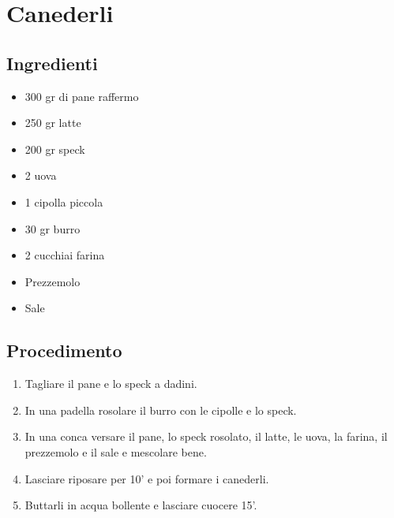 \section{Canederli}
\subsection{Ingredienti}
\begin{itemize}
\item 300 gr di pane raffermo  
\item 250 gr latte  
\item 200 gr speck  
\item 2 uova  
\item 1 cipolla piccola  
\item 30 gr burro  
\item 2 cucchiai farina   
\item Prezzemolo  
\item Sale
\end{itemize}
\subsection{Procedimento}
\begin{enumerate}
\item  Tagliare il pane e lo speck a dadini.   
\item  In una padella rosolare il burro con le cipolle e lo speck.   
\item  In una conca versare il pane, lo speck rosolato, il latte, le uova, la farina, il prezzemolo e il sale e mescolare bene.  
\item  Lasciare riposare per 10' e poi formare i canederli.  
\item  Buttarli in acqua bollente e lasciare cuocere 15'.
\end{enumerate}
